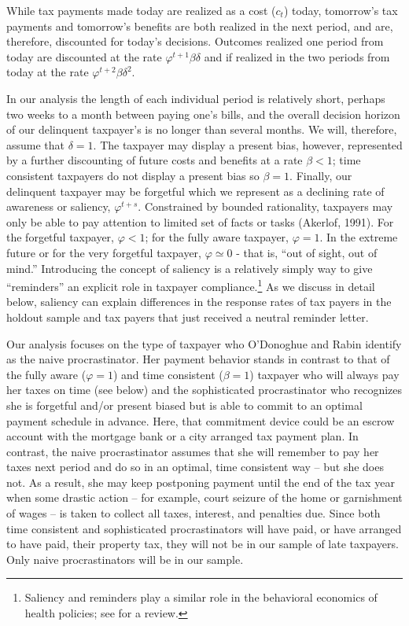 \documentclass[12pt]{article}
\begin{document}
While tax payments made today are realized as a cost  ($c_{t}$) today,
tomorrow's tax payments and tomorrow's benefits are both realized in
the next period, and are, therefore, discounted for today's decisions.
Outcomes realized one period from today are discounted at the rate
$\varphi^{t+1} \beta \delta$ and if realized in the two periods from
today at the rate $\varphi^{t+2} \beta \delta^2$. 

In our analysis the length of each individual period is relatively
short, perhaps two weeks to a month between paying one's bills, and
the overall decision horizon of our delinquent taxpayer's is no longer
than several months.  We will, therefore, assume that $\delta=1$.  The
taxpayer may display a present bias, however, represented by a further
discounting of future costs and benefits at a rate $\beta <1$; time
consistent taxpayers do not display a present bias so $\beta=1$.
Finally, our delinquent taxpayer may be forgetful which we represent
as a declining rate of awareness or saliency, $\varphi^{t+s}$.
Constrained by bounded rationality, taxpayers may only be able to pay
attention to limited set of facts or tasks (Akerlof, 1991).  For the
forgetful taxpayer, $\varphi < 1$; for the fully aware taxpayer,
$\varphi = 1$. In the extreme future or for the very forgetful
taxpayer, $\varphi \simeq 0$ - that is, ``out of sight, out of mind.''
Introducing the concept of saliency is a relatively simply way to give
``reminders'' an explicit role in taxpayer compliance.\footnote{
  Saliency and reminders play a similar role in the behavioral
  economics of health policies; see  for a
  review.} As we discuss in detail below, saliency can explain
differences in the response rates of tax payers in the holdout sample
and tax payers that just received a neutral reminder letter.

Our analysis focuses on the type of taxpayer who O'Donoghue and Rabin
identify as the naive procrastinator.  Her payment behavior stands in
contrast to that of the fully aware ($\varphi = 1$) and time
consistent ($\beta = 1$) taxpayer who will always pay her taxes on
time (see below) and the sophisticated procrastinator who recognizes
she is forgetful and/or present biased but is able to commit to an
optimal payment schedule in advance.  Here, that commitment device
could be an escrow account with the mortgage bank or a city arranged
tax payment plan.  In contrast, the naive procrastinator assumes that
she will remember to pay her taxes next period and do so in an
optimal, time consistent way -- but she does not.  As a result, she
may keep postponing payment until the end of the tax year when some
drastic action -- for example, court seizure of the home or
garnishment of wages -- is taken to collect all taxes, interest, and
penalties due.  Since both time consistent and sophisticated
procrastinators will have paid, or have arranged to have paid, their
property tax, they will not be in our sample of late taxpayers.  Only
naive procrastinators will be in our sample.
\end{document}
